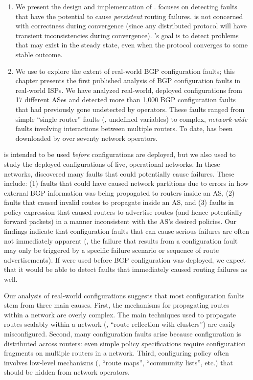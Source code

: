 \begin{enumerate}
\itemsep=-1pt
\item We present the design and implementation of {\bf \rccns}.
\rcc focuses on detecting faults that have the potential to cause {\em
  persistent} routing failures.  \rcc is not concerned with
correctness during convergence (since any distributed protocol will
have transient inconsistencies during convergence).  \rccns's goal is
to detect problems that may exist in the steady state, even when the
protocol converges to some stable outcome.

\item We use \rcc to explore the extent of real-world BGP
configuration faults; this chapter presents the first published analysis
of BGP configuration faults in real-world ISPs.  
We have analyzed real-world,
deployed configurations from 17 different ASes and detected more than
1,000 BGP configuration faults that had previously gone undetected by
operators.  These faults ranged from simple ``single router'' faults
(\eg, undefined variables) to complex, {\em network-wide} faults
involving interactions between multiple routers.  
To date, \rcc has been downloaded by over seventy network operators.
\end{enumerate}

\rcc is intended to be used {\em before} configurations are
deployed, but we also used \rcc to study the deployed configurations of live,
operational networks.  In these networks, \rcc discovered many
faults that could potentially cause failures.  These include: (1) faults
that could have caused network partitions due to errors in how external
BGP information was being propagated to routers inside an AS, (2) faults
that caused invalid routes to propagate inside an AS, and (3) faults in
policy expression that caused routers to advertise routes (and hence
potentially forward packets) in a manner inconsistent with the AS's
desired policies.
%
Our findings indicate that configuration faults that can
cause serious failures are often not immediately apparent (\ie, the
failure that results 
from a configuration fault may only be triggered by a specific failure
scenario or sequence of route advertisements).  If \rcc were used before
BGP configuration was deployed, we expect that it would be able to
detect faults that immediately caused routing failures as well.

Our analysis of real-world configurations suggests that most
configuration faults stem from three main causes.  First, the mechanisms
for propagating routes within a network are overly complex.  The main
techniques used to propagate routes scalably within a network (\eg,
``route reflection with clusters'') are easily misconfigured.  Second,
many configuration faults arise because configuration is distributed
across routers: even simple policy specifications require configuration
fragments on multiple routers in a network.  Third, configuring policy
often involves low-level mechanisms (\eg, ``route maps'', ``community
lists'', etc.)  that should be hidden from network operators.


